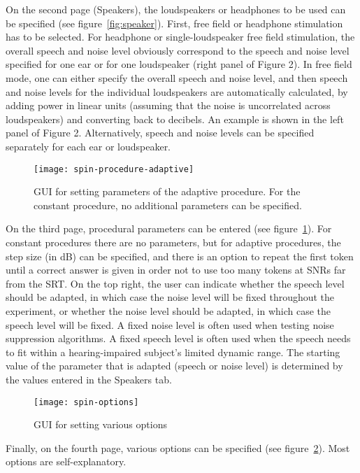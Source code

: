 {On the second page (Speakers), the loudspeakers or headphones to be used
can be specified (see figure~\ref{fig:speaker}). First, free
field or headphone stimulation has to be selected. For headphone or
single-loudspeaker free field stimulation, the overall speech and noise
level obviously correspond to the speech and noise level specified for
one ear or for one loudspeaker (right panel of Figure 2). In free field mode, one can either
specify the overall speech and noise level, and then speech and noise
levels for the individual loudspeakers are automatically calculated, by
adding power in linear units (assuming that the noise is uncorrelated
across loudspeakers) and converting back to decibels. An example is shown in the left panel of Figure 2. Alternatively,
speech and noise levels can be specified separately for each ear or
loudspeaker. 

 \begin{figure} 
\texttt{[image: spin-procedure-adaptive]}
\caption{GUI for setting parameters of the adaptive procedure. For the constant procedure, no additional parameters can be specified. }
\label{fig:procedure} \end{figure} 

On the third page, procedural parameters can be entered (see
figure~\ref{fig:procedure}). For constant procedures there are no
parameters, but for adaptive procedures, the step size (in dB) can be
specified, and there is an option to repeat the first token until a
correct answer is given \citep{pm760724} in order not to use too many tokens at SNRs far from
the SRT. On the top right, the user can indicate whether the speech
level should be adapted, in which case the noise level will be fixed
throughout the experiment, or whether the noise level should be adapted,
in which case the speech level will be fixed. A fixed noise level is
often used when testing noise suppression algorithms. A fixed speech
level is often used when the speech needs to fit within a
hearing-impaired subject's limited dynamic range. The starting value of
the parameter that is adapted (speech or noise level) is determined by
the values entered in the Speakers tab.

 \begin{figure} 
\texttt{[image: spin-options]}
\caption{GUI for setting various options} \label{fig:options}
\end{figure} 

Finally, on the fourth page, various options can be specified (see
figure~\ref{fig:options}). Most options are self-explanatory.

}
